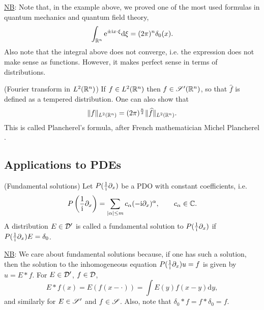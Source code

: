 \documentclass[11pt]{article}
\begin{document}
			\noindent\underline{NB}: Note that, in the example above, we proved one of the most used formulas in quantum mechanics and quantum field theory,
			\begin{equation*}
				\int_{\mathbb{R}^n}\mathrm{e}^{\pm\mathrm{i} x\cdot\xi}\mathrm{d}\xi=(2\pi)^n\delta_0(x).
			\end{equation*}
			Also note that the integral above does not converge, i.e. the expression does not make sense as functions. However, it makes perfect sense in terms of distributions.

			\begin{remark}\label{rem--plancherel}(Fourier transform in $L^2(\mathbb{R}^n)$)
				If $f\in L^2(\mathbb{R}^n)$ then $f\in\mathscr{S}^\prime(\mathbb{R}^n)$, so that $\hat{f}$ is defined as a tempered distribution. One can also show that
				\begin{equation*}
					\|f\|_{L^2(\mathbb{R}^n)}=(2\pi)^{\frac{n}{2}}\|\widehat{f}\|_{L^2(\mathbb{R}^n)}.
				\end{equation*}
				This is called Plancherel's formula, after French mathematician Michel Plancherel .
			\end{remark}


		\subsection{Applications to PDEs}

			\begin{defi}(Fundamental solutions)
				Let $P(\frac{1}{\mathrm{i}}\partial_x)$ be a PDO with constant coefficients, i.e. 
				\begin{equation*}
					P\left(\frac{1}{\mathrm{i}}\partial_x\right)=\sum_{|\alpha|\le m}c_\alpha(-\mathrm{i}\partial_x)^\alpha,\qquad c_\alpha\in\mathbb{C}.
				\end{equation*}
				A distribution $E\in\mathcal{D}^\prime$ is called a fundamental solution to $P(\frac{1}{\mathrm{i}}\partial_x)$ if $P(\frac{1}{\mathrm{i}}\partial_x)E=\delta_0$.
			\end{defi}

			\noindent\underline{NB}: We care about fundamental solutions because, if one has such a solution, then the solution to the inhomogeneous equation $P(\frac{1}{\mathrm{i}}\partial_x)u=f$ is given by $u=E\ast f$. For $E\in\mathcal{D}^\prime$, $f\in \mathcal{D}$,
			\begin{equation*}
				E\ast f(x)=E(f(x-\cdot))=\int E(y)f(x-y)\mathrm{d}y,
			\end{equation*}
			and similarly for $E\in\mathscr{S}^\prime$ and $f\in\mathscr{S}$. Also, note that $\delta_0\ast f=f\ast\delta_0=f$.
			\\
\end{document}
